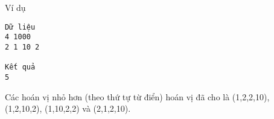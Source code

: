 Ví dụ
\begin{verbatim}
Dữ liệu
4 1000 
2 1 10 2 

Kết quả
5
\end{verbatim}

   Các hoán vị nhỏ hơn (theo thứ tự từ điển) hoán vị đã cho là (1,2,2,10), (1,2,10,2), (1,10,2,2) và (2,1,2,10).